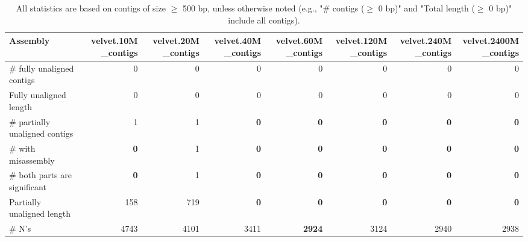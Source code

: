 \documentclass[12pt,a4paper]{article}
\begin{document}
\begin{table}[ht]
\begin{center}
\caption{All statistics are based on contigs of size $\geq$ 500 bp, unless otherwise noted (e.g., "\# contigs ($\geq$ 0 bp)" and "Total length ($\geq$ 0 bp)" include all contigs).}
\begin{tabular}{|l*{7}{|r}|}
\hline
Assembly & velvet.10M\_contigs & velvet.20M\_contigs & velvet.40M\_contigs & velvet.60M\_contigs & velvet.120M\_contigs & velvet.240M\_contigs & velvet.2400M\_contigs \\ \hline
\# fully unaligned contigs & 0 & 0 & 0 & 0 & 0 & 0 & 0 \\ \hline
Fully unaligned length & 0 & 0 & 0 & 0 & 0 & 0 & 0 \\ \hline
\# partially unaligned contigs & 1 & 1 & {\bf 0} & {\bf 0} & {\bf 0} & {\bf 0} & {\bf 0} \\ \hline
\hspace{5mm}\# with misassembly & {\bf 0} & 1 & {\bf 0} & {\bf 0} & {\bf 0} & {\bf 0} & {\bf 0} \\ \hline
\hspace{5mm}\# both parts are significant & {\bf 0} & 1 & {\bf 0} & {\bf 0} & {\bf 0} & {\bf 0} & {\bf 0} \\ \hline
Partially unaligned length & 158 & 719 & {\bf 0} & {\bf 0} & {\bf 0} & {\bf 0} & {\bf 0} \\ \hline
\# N's & 4743 & 4101 & 3411 & {\bf 2924} & 3124 & 2940 & 2938 \\ \hline
\end{tabular}
\end{center}
\end{table}
\end{document}
